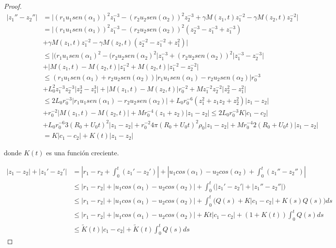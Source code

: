 \documentclass[a4paper,10pt]{scrartcl}
\theoremstyle{definition}
\numberwithin{equation}{section}
\begin{document}
\begin{proof}
 \begin{align*}
  |z_1'' - z_2''| &=
  \bigg|(r_1 u_1 sen(\alpha_1))^2 z_1^{-3} - (r_2 u_2 sen(\alpha_2))^2 z_2^{-3} + \gamma M(z_1, t) z_1^{-2} - \gamma M(z_2, t) z_2^{-2} \bigg| \\
  &= \bigg|(r_1 u_1 sen(\alpha_1))^2 z_1^{-3} - (r_2 u_2 sen(\alpha_2))^2 (z_2^{-3} - z_1^{-3} + z_1^{-3}) \\
  &+ \gamma M(z_1, t) z_1^{-2} - \gamma M(z_2, t) (z_2^{-2} - z_1^{-2} + z_1^{2}) \bigg| \\
  &\le \bigg|(r_1 u_1 sen(\alpha_1)^2 - (r_2 u_2 sen(\alpha_2)^2 \bigg| z_1^{-3} + (r_2 u_2 sen(\alpha_2))^2 \bigg|z_1^{-3} - z_2^{-3}\bigg| \\
  &+ \bigg|M(z_1,t) - M(z_2,t) \bigg|z_1^{-2} + M(z_2, t) \bigg|z_1^{-2} - z_2^{-2}\bigg| \\
  &\le (r_1 u_1 sen(\alpha_1)+ r_2 u_2 sen(\alpha_2))\bigg|r_1 u_1 sen(\alpha_1) - r_2 u_2 sen(\alpha_2)\bigg| r_0^{-3} \\
  &+ L_0^2 z_1^{-3}z_2^{-3} \bigg|z_2^3 - z_1^3 \bigg| + \bigg|M(z_1,t) - M(z_2,t)\bigg| r_0^{-2} + Mz_1^{-2} z_2^{-2} \bigg|z_2^2 - z_1^2\bigg| \\
  &\le 2L_0 r_0^{-3}\bigg|r_1 u_1 sen(\alpha_1) - r_2 u_2 sen(\alpha_2)\bigg|
  + L_0 r_0^{-6}(z_1^2 + z_1 z_2 + z_2^2)\bigg|z_1 - z_2\bigg|\\
  &+ r_0^{-2}\bigg|M(z_1,t) - M(z_2,t)\bigg| + Mr_0^{-4}(z_1 + z_2) \bigg|z_1 - z_2\bigg| \le 2L_0 r_0^{-3} K|c_1 - c_2| \\
  &+ L_0 r_0^{-6} 3(R_0 + U_0t)^2 |z_1 - z_2| + r_0^{-2} 4\pi (R_0 + U_0t)^2 \rho_0 |z_1 - z_2| + Mr_0^{-4} 2(R_0 + U_0t) |z_1 - z_2|\\
  &= K|c_1 - c_2| + K(t)|z_1 - z_2|
 \end{align*}
 
 donde $K(t)$ es una función creciente.
 
 \begin{align*}
  |z_1 - z_2| + |z_1' - z_2'| &= \left|r_1 - r_2 + \int_0^t (z_1' - z_2')\right| + \left|u_1 cos(\alpha_1) - u_2 cos(\alpha_2) + \int_0^t (z_1'' - z_2'') \right|\\
  &\le |r_1 - r_2| + |u_1 cos(\alpha_1) - u_2 cos(\alpha_2)| + \int_0^t \bigg(|z_1' - z_2'| + |z_1'' - z_2''|\bigg) \\
  &\le |r_1 - r_2| + |u_1 cos(\alpha_1) - u_2 cos(\alpha_2)| + \int_0^t \bigg(Q(s) + K|c_1 - c_2| + K(s)Q(s)\bigg) ds \\
  &\le |r_1 - r_2| + |u_1 cos(\alpha_1) - u_2 cos(\alpha_2)| + Kt|c_1 - c_2| + (1 + K(t)) \int_0^t Q(s) ds\\
  &\le \widetilde{K}(t)|c_1 - c_2| + \widetilde{K}(t) \int_0^t Q(s) ds
 \end{align*}


\end{proof}
\end{document}
